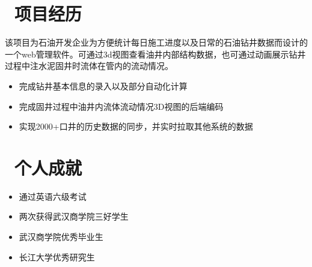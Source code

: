 \documentclass{resume}
\begin{document}
\section{\faUsers\ 项目经历}
\begin{onehalfspacing}
    该项目为石油开发企业为方便统计每日施工进度以及日常的石油钻井数据而设计的一个web管理软件。可通过3d视图查看油井内部结构数据，也可通过动画展示钻井过程中注水泥固井时流体在管内的流动情况。
\begin{itemize}
  \item 完成钻井基本信息的录入以及部分自动化计算
  \item 完成固井过程中油井内流体流动情况3D视图的后端编码
  \item 实现2000+口井的历史数据的同步，并实时拉取其他系统的数据
\end{itemize}
\end{onehalfspacing}

\section{\faHeartO\ 个人成就}
\begin{itemize}[parsep=0.5ex]
  \item 通过英语六级考试
  \item 两次获得武汉商学院三好学生
  \item 武汉商学院优秀毕业生
  \item 长江大学优秀研究生
\end{itemize}


%
%
\end{document}

